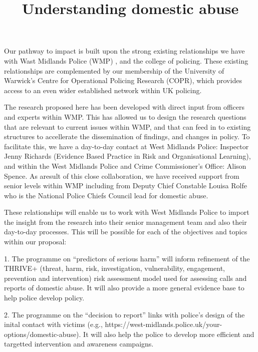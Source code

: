 \documentclass[11pt, a4paper]{article}
\begin{document}
\title{Understanding domestic abuse}
\date{}
\maketitle


Our pathway to impact is built upon the strong existing relationships we have with Wast Midlands Police (WMP) , and the college of policing. These existing relationships are complemented by our membership of the University of Warwick's Centre for Operational Policing Research (COPR), which provides access to an even wider established network within UK policing. 

The research proposed here has been developed with direct input from officers and experts within WMP. This has allowed us to design the research questions that are relevant to current issues within WMP, and that can feed in to existing structures to accellerate the dissemination of findings, and changes in policy. To facilitate this, we have a day-to-day contact at West Midlands Police: Inspector Jenny Richards (Evidence Based Practice in Risk and Organisational Learning), and within the West Midlands Police and Crime Commissioner's Office: Alison Spence. As aresult of this close collaboration, we have received support from senior levels within WMP including from Deputy Chief Constable Louisa Rolfe who is the National Police Chiefs Council lead for domestic abuse.

These relationships will enable us to work with West Midlands Police to import the insight from the research into their senior management team and also their day-to-day processes. This will be possible for each of the objectives and topics within our proposal: 

1. The programme on ``predictors of serious harm'' will inform refinement of the THRIVE+ (threat, harm, risk, investigation, vulnerability, engagement, prevention and intervention) risk assessment model used for assessing calls and reports of domestic abuse. It will also provide a more general evidence base to help police develop policy.

2. The programme on the  ``decision to report'' links with police's design of the inital contact with victims (e.g., https://west-midlands.police.uk/your-options/domestic-abuse). It will also help the police to develop more efficient and targetted intervention and awareness campaigns.
\end{document}
